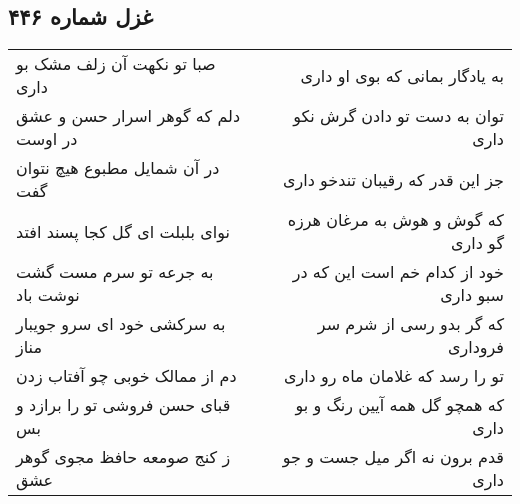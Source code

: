 \begin{center}
\section*{غزل شماره ۴۴۶}
\label{sec:sh446}
\begin{longtable}{l p{0.5cm} r}
صبا تو نکهت آن زلف مشک بو داری
&&
به یادگار بمانی که بوی او داری
\\
دلم که گوهر اسرار حسن و عشق در اوست
&&
توان به دست تو دادن گرش نکو داری
\\
در آن شمایل مطبوع هیچ نتوان گفت
&&
جز این قدر که رقیبان تندخو داری
\\
نوای بلبلت ای گل کجا پسند افتد
&&
که گوش و هوش به مرغان هرزه گو داری
\\
به جرعه تو سرم مست گشت نوشت باد
&&
خود از کدام خم است این که در سبو داری
\\
به سرکشی خود ای سرو جویبار مناز
&&
که گر بدو رسی از شرم سر فروداری
\\
دم از ممالک خوبی چو آفتاب زدن
&&
تو را رسد که غلامان ماه رو داری
\\
قبای حسن فروشی تو را برازد و بس
&&
که همچو گل همه آیین رنگ و بو داری
\\
ز کنج صومعه حافظ مجوی گوهر عشق
&&
قدم برون نه اگر میل جست و جو داری
\\
\end{longtable}
\end{center}
